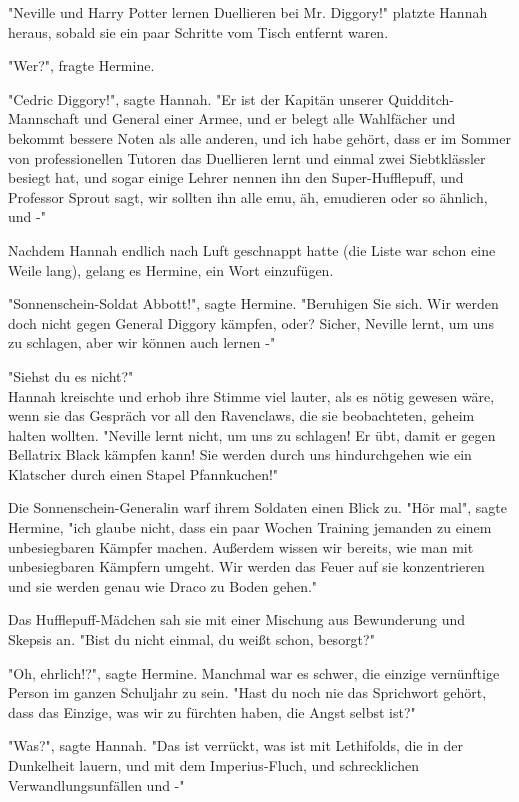 {"Neville und Harry Potter lernen Duellieren bei Mr. Diggory!" platzte Hannah heraus, sobald sie ein paar Schritte vom Tisch entfernt waren.

"Wer?", fragte Hermine.

"Cedric Diggory!", sagte Hannah. "Er ist der Kapitän unserer Quidditch-Mannschaft und General einer Armee, und er belegt alle Wahlfächer und bekommt bessere Noten als alle anderen, und ich habe gehört, dass er im Sommer von professionellen Tutoren das Duellieren lernt und einmal zwei Siebtklässler besiegt hat, und sogar einige Lehrer nennen ihn den Super-Hufflepuff, und Professor Sprout sagt, wir sollten ihn alle emu, äh, emudieren oder so ähnlich, und -"

Nachdem Hannah endlich nach Luft geschnappt hatte (die Liste war schon eine Weile lang), gelang es Hermine, ein Wort einzufügen.

"Sonnenschein-Soldat Abbott!", sagte Hermine. "Beruhigen Sie sich. Wir werden doch nicht gegen General Diggory kämpfen, oder? Sicher, Neville lernt, um uns zu schlagen, aber wir können auch lernen -"

"Siehst du es nicht?"\\ Hannah kreischte und erhob ihre Stimme viel lauter, als es nötig gewesen wäre, wenn sie das Gespräch vor all den Ravenclaws, die sie beobachteten, geheim halten wollten. "Neville lernt nicht, um uns zu schlagen! Er übt, damit er gegen Bellatrix Black kämpfen kann! Sie werden durch uns hindurchgehen wie ein Klatscher durch einen Stapel Pfannkuchen!"

Die Sonnenschein-Generalin warf ihrem Soldaten einen Blick zu. "Hör mal", sagte Hermine, "ich glaube nicht, dass ein paar Wochen Training jemanden zu einem unbesiegbaren Kämpfer machen. Außerdem wissen wir bereits, wie man mit unbesiegbaren Kämpfern umgeht. Wir werden das Feuer auf sie konzentrieren und sie werden genau wie Draco zu Boden gehen."

Das Hufflepuff-Mädchen sah sie mit einer Mischung aus Bewunderung und Skepsis an. "Bist du nicht einmal, du weißt schon, besorgt?"

"Oh, ehrlich!?", sagte Hermine. Manchmal war es schwer, die einzige vernünftige Person im ganzen Schuljahr zu sein. "Hast du noch nie das Sprichwort gehört, dass das Einzige, was wir zu fürchten haben, die Angst selbst ist?"

"Was?", sagte Hannah. "Das ist verrückt, was ist mit Lethifolds, die in der Dunkelheit lauern, und mit dem Imperius-Fluch, und schrecklichen Verwandlungsunfällen und -"

}
